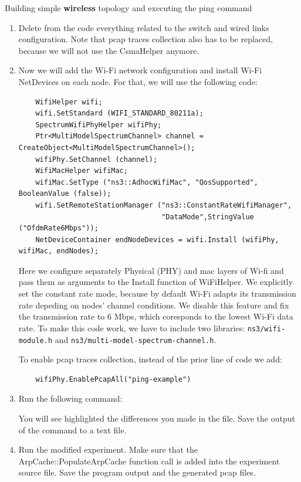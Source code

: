 \begin{exercise}{Building simple \textbf{wireless} topology and executing the ping command}
	\begin{enumerate}
	\item Delete from the code everything related to the switch and wired links configuration. Note that pcap traces collection also has to be replaced, because we will not use the CsmaHelper anymore.
	
	\item Now we will add the Wi-Fi network configuration and install Wi-Fi NetDevices on each node. For that, we will use the following code:
	\begin{lstlisting}
	WifiHelper wifi;
	wifi.SetStandard (WIFI_STANDARD_80211a);
	SpectrumWifiPhyHelper wifiPhy;
	Ptr<MultiModelSpectrumChannel> channel = CreateObject<MultiModelSpectrumChannel>();
	wifiPhy.SetChannel (channel);
	WifiMacHelper wifiMac;
	wifiMac.SetType ("ns3::AdhocWifiMac", "QosSupported", BooleanValue (false));
	wifi.SetRemoteStationManager ("ns3::ConstantRateWifiManager",
	                              "DataMode",StringValue ("OfdmRate6Mbps"));
	NetDeviceContainer endNodeDevices = wifi.Install (wifiPhy, wifiMac, endNodes);
	\end{lstlisting}
	
	Here we configure separately Physical (PHY) and \ac{mac} layers of Wi-fi and pass them as arguments to the Install function of WiFiHelper. We explicitly set the constant rate mode, because by default Wi-Fi adapts its transmission rate depeding on nodes' channel conditions. We disable this feature and fix the transmission rate to 6 Mbps, which coresponds to the lowest Wi-Fi data rate. To make this code work, we have to include two libraries: \nolinkurl{ns3/wifi-module.h} and \nolinkurl{ns3/multi-model-spectrum-channel.h}.
	
	To enable pcap traces collection, instead of the prior line of code we add:
	\begin{lstlisting}
	wifiPhy.EnablePcapAll("ping-example")
	\end{lstlisting}
	
	\item Run the following command:
	\begin{cmdblock}[gobble=2]
	\end{cmdblock}
	You will see highlighted the differences you made in the file. Save the output of the command to a text file.
	
	\item Run the modified experiment. Make sure that the ArpCache::PopulateArpCache function call is added into the experiment source file. Save the program output and the generated pcap files.
	

\end{enumerate}
\end{exercise}
